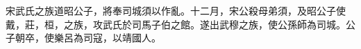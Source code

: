 \begin{pinyinscope}
宋武氏之族道昭公子，將奉司城須以作亂。十二月，宋公殺母弟須，及昭公子使戴，莊，桓，之族，攻武氏於司馬子伯之館。遂出武穆之族，使公孫師為司城。公子朝卒，使樂呂為司寇，以靖國人。


\end{pinyinscope}